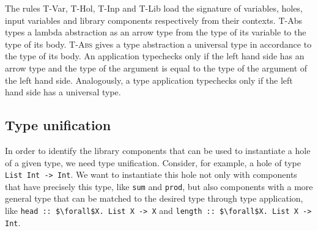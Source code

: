 \begin{prooftree}
\end{prooftree}

\begin{prooftree}
\end{prooftree}

\begin{prooftree}
\end{prooftree}

\begin{prooftree}
\end{prooftree}

The rules T-Var, T-Hol, T-Inp and T-Lib load the signature of variables, holes, input variables and library components respectively from their contexts.
T-Abs types a lambda abstraction as an arrow type from the type of its variable to the type of its body. \textsc{T-Abs} gives a type abstraction a universal type in accordance to the type of its body.
An application typechecks only if the left hand side has an arrow type and the type of the argument is equal to the type of the argument of the left hand side. Analogously, a type application typechecks only if the left hand side has a universal type.

\subsection{Type unification}\label{Unification}

In order to identify the library components that can be used to instantiate a hole of a given type, we need type unification. Consider, for example, a hole of type \lstinline?List Int -> Int?. We want to instantiate this hole not only with components that have precisely this type, like \lstinline?sum? and \lstinline?prod?, but also components with a more general type that can be matched to the desired type through type application, like \lstinline?head :: $\forall$X. List X -> X? and \lstinline?length :: $\forall$X. List X -> Int?.

